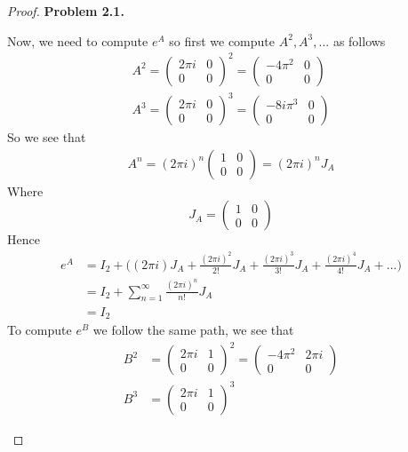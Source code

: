 \documentclass[11pt]{article}
\theoremstyle{definition}
\begin{document}
\begin{proof}{\textbf{Problem 2.1.}}
\begin{itemize}
    Now, we need to compute $e^A$ so first we compute $A^2, A^3, ...$ as follows
    \begin{align*}
        A^2 = \begin{pmatrix} 2\pi i & 0\\ 0 & 0 \end{pmatrix}^2
        = \begin{pmatrix} -4\pi^2 &  0\\ 0 & 0 \end{pmatrix}\\
        A^3 = \begin{pmatrix} 2\pi i & 0\\ 0 & 0 \end{pmatrix}^3
        = \begin{pmatrix} -8i\pi^3 &  0\\ 0 & 0 \end{pmatrix}
    \end{align*}
    So we see that
    \begin{align*}
        A^n = (2\pi i)^{n}\begin{pmatrix} 1 & 0\\ 0 & 0 \end{pmatrix}
        = (2\pi i)^{n}J_A
    \end{align*}
    Where
    $$J_A = \begin{pmatrix} 1 & 0\\ 0 & 0 \end{pmatrix}$$
    Hence
    \begin{align*}
        e^A &= I_2 + \bigg((2\pi i)J_A + \frac{(2\pi i)^2}{2!}J_A
        + \frac{(2\pi i)^3}{3!}J_A + \frac{(2\pi i)^4}{4!}J_A + ...\bigg)\\
        &= I_2 + \sum_{n=1}^\infty \frac{(2\pi i)^n}{n!}J_A\\
        &= I_2
    \end{align*}
    To compute $e^B$ we follow the same path, we see that 
    \begin{align*}
        B^2 &= \begin{pmatrix} 2\pi i & 1\\ 0 & 0 \end{pmatrix}^2
        = \begin{pmatrix} -4\pi^2 &  2\pi i\\ 0 & 0 \end{pmatrix}\\
        B^3 &= \begin{pmatrix} 2\pi i & 1\\ 0 & 0 \end{pmatrix}^3

\end{align*}
\end{itemize}
\end{proof}
\end{document}
